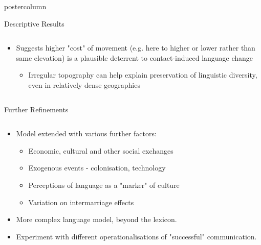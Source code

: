 \documentclass[final,hyperref={pdfpagelabels=false}]{beamer}
\begin{document}
\begin{frame}
\begin{columns}
\begin{column}{.33\textwidth}
\begin{beamercolorbox}[center,wd=\textwidth]{postercolumn}
\begin{minipage}[T]{.95\textwidth}
{\begin{block}{Descriptive Results}
\begin{columns}
\begin{column}{.99\textwidth}
\begin{itemize}
                    \item Suggests higher "cost" of movement (e.g. here to higher or lower rather than same elevation) is a plausible deterrent to
                     contact-induced language change
                      \begin{itemize}
                        \item Irregular topography can help explain preservation of linguistic diversity, even in relatively dense geographies
                      \end{itemize}
                  \end{itemize}
                \end{column}
              \end{columns}
            \end{block}
            \vfill
            \begin{block}{Further Refinements}
              \begin{columns}
                \begin{column}{.99\textwidth}
                  \begin{itemize}
                    \item Model extended with various further factors:
                      \begin{itemize}
                        \item Economic, cultural and other social exchanges
                        \item Exogenous events - colonisation, technology
                        \item Perceptions of language as a "marker" of culture
                        \item Variation on intermarriage effects
                      \end{itemize}
                      \item More complex language model, beyond the lexicon.
                      \item Experiment with different operationalisations of "successful" communication.
                  \end{itemize}
                \end{column}
              \end{columns}
            \end{block}
          }
        \end{minipage}
      \end{beamercolorbox}
    \end{column}


\end{columns}
\end{frame}
\end{document}
